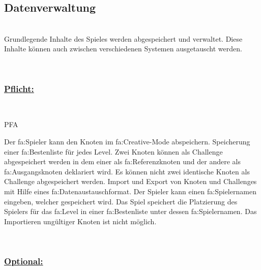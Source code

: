 %
%


\subsection{Datenverwaltung}

%
%
\renewcommand{\K}{}
%
%

~\\
Grundlegende Inhalte des Spieles werden abgespeichert und verwaltet.
Diese Inhalte können auch zwischen verschiedenen Systemen ausgetauscht werden.

~\\

%
%
\subsubsection*{\underline{Pflicht:}}~\\

\begin{ids}{\gls{PFA\K}}

	\id[ 390] Der \gls{fa:Spieler} kann den Knoten im \gls{fa:Creative}-Mode abspeichern.
	\id[ 400]Speicherung einer \gls{fa:Bestenliste} für jedes Level.
	\id[ 410] Zwei Knoten können als Challenge abgespeichert werden in dem einer als \gls{fa:Referenzknoten} und der andere als \gls{fa:Ausgangsknoten} deklariert wird.
	\id[420] Es können nicht zwei identische Knoten als Challenge abgespeichert werden.
	\id[ 430] Import und Export von Knoten und Challenges mit Hilfe eines \gls{fa:Datenaustauschformat}.
	\id[ 440] Der Spieler kann einen \gls{fa:Spielername}n eingeben, welcher gespeichert wird.
	\id[ 450] Das Spiel speichert die Platzierung des Spielers  für das \gls{fa:Level} in einer \gls{fa:Bestenliste} unter dessen \gls{fa:Spielername}n.
	\id[ 460] Das Importieren ungültiger Knoten ist nicht möglich.
	
 	
 	
	
\end{ids}

~\\


%
%
\subsubsection*{\underline{Optional:}}~\\


